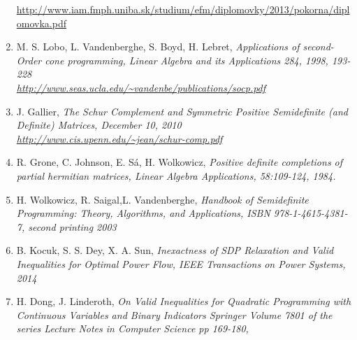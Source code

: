 \documentclass[10pt,oneside]{book}
\theoremstyle{definition}
\begin{document}
\begin{enumerate}
\url{http://www.iam.fmph.uniba.sk/studium/efm/diplomovky/2013/pokorna/diplomovka.pdf}
\label{PokornaSOCPDipl}
%
\item M. S. Lobo, L. Vandenberghe, S. Boyd, H. Lebret, \it Applications of second-Order cone programming, \rm Linear Algebra and its Applications 284, 1998, 193-228\\
\url{http://www.seas.ucla.edu/~vandenbe/publications/socp.pdf}
\label{LoboVandApplicationsofSOCP}
%
\item J. Gallier, \it The Schur Complement and Symmetric Positive Semidefinite (and Definite) Matrices, \rm December 10, 2010 \\
\url{http://www.cis.upenn.edu/~jean/schur-comp.pdf}
\label{GallierSchurCompl}
%
\item R. Grone, C. Johnson, E. Sá, H. Wolkowicz, \it Positive definite completions of partial hermitian matrices, \rm 
Linear Algebra Applications, 58:109-124, 1984.
\label{GronePSDcompletions}
%
\item H. Wolkowicz, R. Saigal,L. Vandenberghe, \it Handbook of Semidefinite Programming: Theory, Algorithms, and Applications, \rm
ISBN 978-1-4615-4381-7, second printing 2003
\label{HandbookSDP}
%
\item B. Kocuk, S. S. Dey, X. A. Sun, \it Inexactness of SDP Relaxation and Valid Inequalities for Optimal Power Flow, \rm
IEEE Transactions on Power Systems, 2014
\label{InexactSDPandValidIneq}
%
\item H. Dong, J. Linderoth, \it On Valid Inequalities for Quadratic Programming with Continuous Variables and Binary Indicators \rm
Springer Volume 7801 of the series Lecture Notes in Computer Science pp 169-180,
\label{onValidIneqforQP}
%



\end{enumerate}
\end{document}
